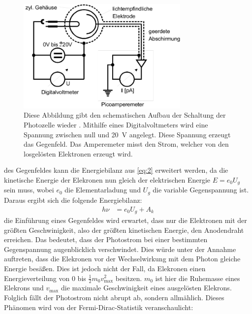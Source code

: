     \begin{figure}[H]
        \centering
        \includegraphics[width=0.75\textwidth]{images/Schaltbild.jpg}
        \caption{Diese Abbildung gibt den schematischen Aufbau der Schaltung der Photozelle wieder \cite{V500}. Mithilfe eines Digitalvoltmeters wird eine Spannung zwischen null und 
        \SI{20}{\volt} angelegt. Diese Spannung erzeugt das Gegenfeld. Das Amperemeter misst den Strom, welcher von den losgelösten Elektronen erzeugt wird.}
        \label{fig:3}
    \end{figure}
    \justifying des Gegenfeldes kann die Energiebilanz aus \eqref{eq:2} erweitert werden, da die kinetische Energie der Elekronen nun gleich der elektrischen Energie $E=e_0 U_g$ sein muss, 
    wobei $e_0$ die Elementarladung und $U_g$ die variable Gegenspannung ist. Daraus ergibt sich die folgende Energiebilanz: \cite{V500}
    \begin{align}
        h\nu &= e_0 U_g + A_k \label{eq:3}
    \end{align}
    \justifying die Einführung eines Gegenfeldes wird erwartet, dass nur die Elektronen mit der größten Geschwinigkeit, also der größten kinetischen Energie, den Anodendraht erreichen. 
    Das bedeutet, dass der Photostrom bei einer bestimmten Gegenspannung augenblicklich verschwindet. Dies würde unter der Annahme auftreten, dass die Elekronen vor der Wechselwirkung
    mit dem Photon gleiche Energie besäßen. Dies ist jedoch nicht der Fall, da Elekronen einen Energieverteilung von 0 bis $\frac{1}{2}m_0 v_{\text{max}}^2$ besitzen. $m_0$ ist 
    hier die Ruhemasse eines Elekrons und $v_{\text{max}}$ die maximale Geschwinigkeit eines ausgelösten Elekrons. Folglich fällt der Photostrom nicht abrupt ab, sondern allmählich.
    Dieses Phänomen wird von der Fermi-Dirac-Statistik veranschaulicht: \cite{V500}
